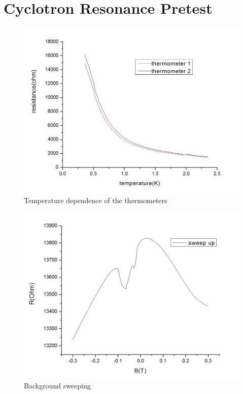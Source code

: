 \documentclass[12pt]{ruthesis}
\begin{document}
\section{Cyclotron Resonance Pretest}\label{Cyclotron}

\begin{figure}
  \centering
  \includegraphics[scale=0.5]{figures/R(T).JPG}
  \caption{Temperature dependence of the thermometers}
  \label{r(t)}
\end{figure}
 
 
\begin{figure}
  \centering
  \includegraphics[scale=0.5]{figures/R(B)UP.JPG}
  \caption{Background sweeping}
  \label{r(b)}
\end{figure}
\end{document}
